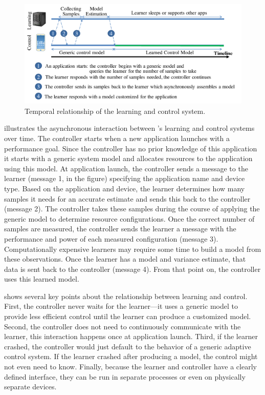 \begin{figure}
  \includegraphics[width=\columnwidth]{figures/Timeline.pdf}
  \caption{Temporal relationship of the learning and control system.}
  \label{fig:timeline}
\end{figure}

 illustrates the asynchronous interaction between
\SYSTEM{}'s learning and control systems over time. The controller
starts when a new application launches with a performance goal.  Since
the controller has no prior knowledge of this application it starts
with a generic system model and allocates resources to the application
using this model.  At application launch, the controller sends a
message to the learner (message 1, in the figure) specifying the
application name and device type.  Based on the application and
device, the learner determines how many samples it needs for an
accurate estimate and sends this back to the controller (message 2).
The controller takes these samples during the course of applying the
generic model to determine resource configurations.  Once the correct
number of samples are measured, the controller sends the learner a
message with the performance and power of each measured configuration
(message 3).  Computationally expensive learners may require some time
to build a model from these observations.  Once the learner has a
model and variance estimate, that data is sent back to the controller
(message 4). From that point on, the controller uses this learned model.  

 shows several key points about the relationship
between learning and control.  First, the controller never waits for
the learner---it uses a generic model to provide less efficient
control until the learner can produce a customized model. Second, the
controller does not need to continuously communicate with the learner,
this interaction happens once at application launch.  Third, if the
learner crashed, the controller would just default to the behavior of
a generic adaptive control system.  If the learner crashed after
producing a model, the control might not even need to know.  Finally,
because the learner and controller have a clearly defined interface,
they can be run in separate processes or even on physically separate
devices.

